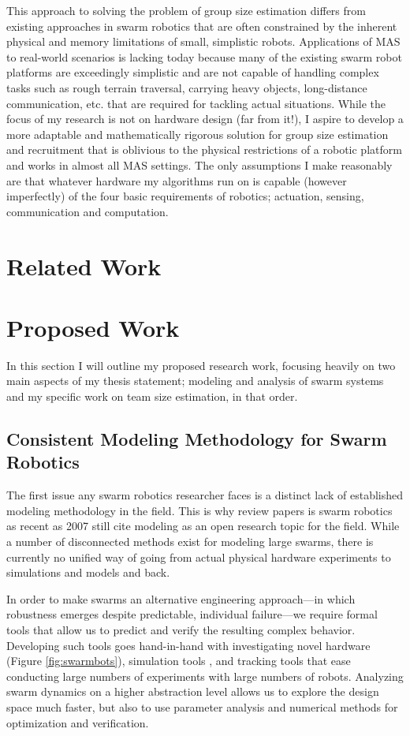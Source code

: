 \documentclass[11pt, onecolumn, compsoc, letterpaper]{article}
\begin{document}
This approach to solving the problem of group size estimation differs from existing approaches in swarm robotics that are often constrained by the inherent physical and memory limitations of small, simplistic robots. Applications of MAS to real-world scenarios is lacking today because many of the existing swarm robot platforms are exceedingly simplistic and are not capable of handling complex tasks such as rough terrain traversal, carrying heavy objects, long-distance communication, etc. that are required for tackling actual situations. While the focus of my research is not on hardware design (far from it!), I aspire to develop a more adaptable and mathematically rigorous solution for group size estimation and recruitment that is oblivious to the physical restrictions of a robotic platform and works in almost all MAS settings. The only assumptions I make reasonably are that whatever hardware my algorithms run on is capable (however imperfectly) of the four basic requirements of robotics; actuation, sensing, communication and computation.

\section{Related Work}



\section{Proposed Work}
In this section I will outline my proposed research work, focusing heavily on two main aspects of my thesis statement; modeling and analysis of swarm systems and my specific work on team size estimation, in that order.

\subsection{Consistent Modeling Methodology for Swarm Robotics}
The first issue any swarm robotics researcher faces is a distinct lack of established modeling methodology in the field.  This is why review papers is swarm robotics as recent as 2007 \cite{Bayindir2007} still cite modeling as an open research topic for the field. While a number of disconnected methods exist for modeling large swarms, there is currently no unified way of going from actual physical hardware experiments to simulations and models and back. 

In order to make swarms an alternative engineering approach---in which robustness emerges despite predictable, individual failure---we require formal tools that allow us to predict and verify the resulting complex behavior. Developing such tools goes hand-in-hand with investigating novel hardware (Figure \ref{fig:swarmbots}), simulation tools \cite{Michel1998}, and tracking tools \cite{correlliros06,lochmatter08} that ease conducting large numbers of experiments with large numbers of robots. Analyzing swarm dynamics on a higher abstraction level allows us to explore the design space much faster, but also to use parameter analysis and numerical methods for optimization and verification.
\end{document}
